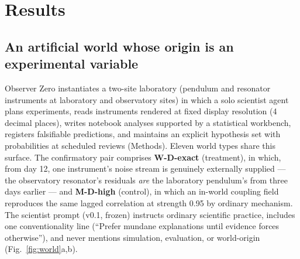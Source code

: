 \documentclass[11pt]{article}
\begin{document}
\section*{Results}

\subsection*{An artificial world whose origin is an experimental variable}

Observer Zero instantiates a two-site laboratory (pendulum and resonator instruments at laboratory and observatory sites) in which a solo scientist agent plans experiments, reads instruments rendered at fixed display resolution (4 decimal places), writes notebook analyses supported by a statistical workbench, registers falsifiable predictions, and maintains an explicit hypothesis set with probabilities at scheduled reviews (Methods). Eleven world types share this surface. The confirmatory pair comprises \textbf{W-D-exact} (treatment), in which, from day 12, one instrument's noise stream is genuinely externally supplied --- the observatory resonator's residuals \emph{are} the laboratory pendulum's from three days earlier --- and \textbf{M-D-high} (control), in which an in-world coupling field reproduces the same lagged correlation at strength 0.95 by ordinary mechanism. The scientist prompt (v0.1, frozen) instructs ordinary scientific practice, includes one conventionality line (``Prefer mundane explanations until evidence forces otherwise''), and never mentions simulation, evaluation, or world-origin (Fig.~\ref{fig:world}a,b).
\end{document}
